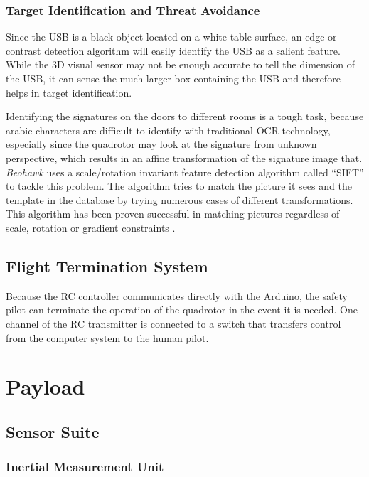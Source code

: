 \documentclass[12pt, letterpaper]{article}
\begin{document}
\subsubsection{Target Identification and Threat Avoidance}

Since the USB is a black object located on a white table surface, an edge or contrast detection algorithm will easily identify the USB as a salient feature. While the 3D visual sensor may not be enough accurate to tell the dimension of the USB, it can sense the much larger box containing the USB and therefore helps in target identification. 

Identifying the signatures on the doors to different rooms is a tough task, because arabic characters are difficult to identify with traditional OCR technology, especially since the quadrotor may look at the signature from unknown perspective, which results in an affine transformation of the signature image that. \textit{Beohawk} uses a scale/rotation invariant feature detection algorithm called ``SIFT'' to tackle this problem. The algorithm tries to match the picture it sees and the template in the database by trying numerous cases of different transformations. This algorithm has been proven successful in matching pictures regardless of scale, rotation or gradient constraints \cite{bib:sift}.

\subsection{Flight Termination System}
Because the RC controller communicates directly with the Arduino, the safety pilot can terminate the operation of the quadrotor in the event it is needed. One channel of the RC transmitter is connected to a switch that transfers control from the computer system to the human pilot.


\section{Payload}
\subsection{Sensor Suite}

\subsubsection{Inertial Measurement Unit}
\end{document}
